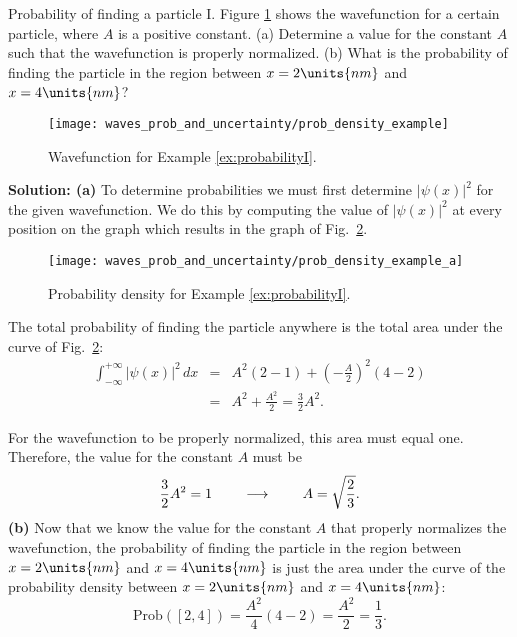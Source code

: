 \begin{example}{Probability of finding a particle I.}
\label{ex:probabilityI}
Figure \ref{fig:example_wavefunction} shows the wavefunction for a
certain particle, where $A$ is a positive constant. (a) Determine a
value for the constant $A$ such that the wavefunction is properly
normalized. (b) What is the probability of finding the particle in the
region between $x = 2\units{nm}$ and $x = 4\units{nm}$?

\begin{figure}
\begin{center}
\texttt{[image: waves\_prob\_and\_uncertainty/prob\_density\_example]}
\end{center}
\caption{Wavefunction for Example \ref{ex:probabilityI}.}
\label{fig:example_wavefunction}
\end{figure}

{\bf Solution: (a)} To determine probabilities we must first determine
$|\psi(x)|^2$ for the given wavefunction. We do this by computing the
value of $|\psi(x)|^2$ at every position on the graph which results in
the graph of Fig.~\ref{fig:example_prob_density}.

\begin{figure}[b]
\begin{center}
\texttt{[image: waves\_prob\_and\_uncertainty/prob\_density\_example\_a]}
\end{center}
\caption{Probability density for Example \ref{ex:probabilityI}.}
\label{fig:example_prob_density}
\end{figure}
The total probability of finding the particle anywhere is the total
area under the curve of Fig.~\ref{fig:example_prob_density}:
\begin{eqnarray} 
\int_{-\infty}^{+\infty} |\psi(x)|^2\, dx 
  &=& A^2 (2 - 1) + \left( - \frac{A}{2} \right)^2 (4 - 2) \nonumber \\
  &=& A^2 + \frac{A^2}{2} = \frac{3}{2} A^2 .
\end{eqnarray}

For the wavefunction to be properly normalized, this area must equal
one.  Therefore, the value for the constant $A$ must be
\begin{equation}
\frac{3}{2} A^2 = 1 \hspace{0.3in} 
              \longrightarrow \hspace{0.3in} A = \sqrt{\frac{2}{3}}.
\end{equation}
{\bf (b)} Now that we know the value for the constant $A$ that
properly normalizes the wavefunction, the probability of finding the
particle in the region between $x = 2\units{nm}$ and $x = 4\units{nm}$ 
is just the area under the curve of the probability density between 
$x = 2\units{nm}$ and $x = 4\units{nm}$:
\begin{equation}
\text{Prob}([2, 4]) = \frac{A^2}{4} (4 - 2) = \frac{A^2}{2} = \frac{1}{3}. 
\end{equation}
\end{example}

